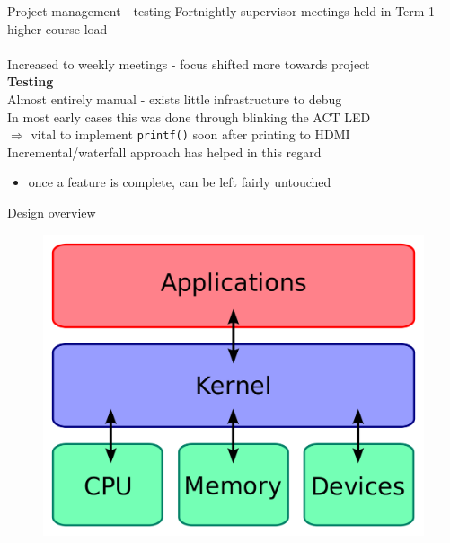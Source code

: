 \documentclass[10pt]{beamer}
\newcommand{\code}[1]{\texttt{#1}}
\begin{document}
\begin{frame}{Project management - testing}
    Fortnightly supervisor meetings held in Term 1 - higher course load \\~\\
    Increased to weekly meetings - focus shifted more towards project \\

    \textbf{Testing} \\
    Almost entirely manual - exists little infrastructure to debug \\
    In most early cases this was done through blinking the ACT LED \\
    $\Rightarrow$ vital to implement \code{printf()} soon after printing to HDMI \\

    Incremental/waterfall approach has helped in this regard
    \begin{itemize}
        \item once a feature is complete, can be left fairly untouched
    \end{itemize}
\end{frame}

\begin{frame}{Design overview}
    \begin{figure}
        \centering
        \includegraphics[width=.8\textwidth]{kernel.png}
    \end{figure}
\end{frame}
\end{document}
